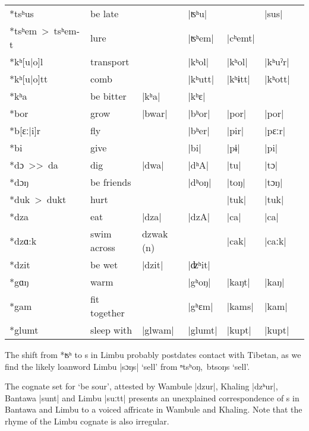 \documentclass[oneside,a4paper,11pt]{article}
\newcommand{\ipa}[1]{{\phon\mbox{#1}}} %
\newcommand{\dhatu}[2]{|\ipa{#1}| `#2'}
\newcommand{\dhat}[1]{|\ipa{#1}|}
\begin{document}
\begin{table}
\begin{tabular}{lllllll}
\ipa{*tsʰus} &	be late &	&	\dhat{ʦʰu} &	&	\dhat{sus} &	\\
\ipa{*tsʰem > tsʰem-t} &	lure &	&	\dhat{ʦʰem} &	\dhat{cʰemt} &	&	\\
\midrule
\ipa{*kʰ[u|o]l} &	transport &	&	\dhat{kʰol} &	\dhat{kʰol} &	\dhat{kʰuˀr} &	\\
\ipa{*kʰ[u|o]tt} &	comb &	&	\dhat{kʰutt} &	\dhat{kʰɨtt} &	\dhat{kʰott} &	\\
\ipa{*kʰa} &	be bitter &	\dhat{kʰa} &	\dhat{kʰɛ} &	&	&	\\
\midrule
\ipa{*bor} &	grow &	\dhat{bwar} &	\dhat{bʰor} &	\dhat{por} &	\dhat{por} &	\\
\ipa{*b[ɛː|i]r} &	fly &	&	\dhat{bʰer} &	\dhat{pir} &	\dhat{pɛːr} &	\\
\ipa{*bi} &	give &	&	\dhat{bi} &	\dhat{pɨ} &	\dhat{pi} &	\\
\midrule
\ipa{*dɔ >{}>  da} &	dig &	\dhat{dwa} &	\dhat{dʰA} &	\dhat{tu} &	\dhat{tɔ} &	\\
\ipa{*dɔŋ} &	be friends &	&	\dhat{dʰoŋ} &	\dhat{toŋ} &	\dhat{tɔŋ} &	\\
\ipa{*duk > dukt} &	hurt &	&	&	\dhat{tuk} &	\dhat{tuk} &	\\
\midrule				
\ipa{*dza} &	eat &	\dhat{dza} &	\dhat{dzA} &	\dhat{ca} &	\dhat{ca} &	\\
\ipa{*dzɑ:k} &	swim across &	\ipa{dzwak } (n) &	&	\dhat{cak} &	\dhat{caːk} &	\\
\ipa{*dzit} &	be wet &	\dhat{dzit}   &	\dhat{ʣʰit} &	&	&	\\
\midrule		
\ipa{*gɑŋ} &	warm &	&	\dhat{gʰoŋ} &	\dhat{kaŋt} &	\dhat{kaŋ} &	\\
\ipa{*gam} &	fit together &	&	\dhat{gʰɛm} &	\dhat{kams} &	\dhat{kam} &	\\
\ipa{*glumt} &	sleep with &	\dhat{glwam} &	\dhat{glumt} &	\dhat{kupt} &	\dhat{kupt} &	\\
\bottomrule
\end{tabular}
\end{table}

The shift from *\ipa{ʦʰ} to \ipa{s} in Limbu probably postdates contact with Tibetan, as we find the likely loanword Limbu \dhatu{sɔŋs}{sell} from \ipa{ⁿtsʰoŋ, btsoŋs} `sell'.


The cognate set for `be sour', attested by Wambule |\ipa{dzur}|, Khaling |\ipa{dzʰur}|, Bantawa |\ipa{sunt}| and Limbu |\ipa{suːtt}| presents an unexplained correspondence of \ipa{s} in Bantawa and Limbu to a voiced affricate in Wambule and Khaling. Note that the rhyme of the Limbu cognate is also irregular.
\end{document}
